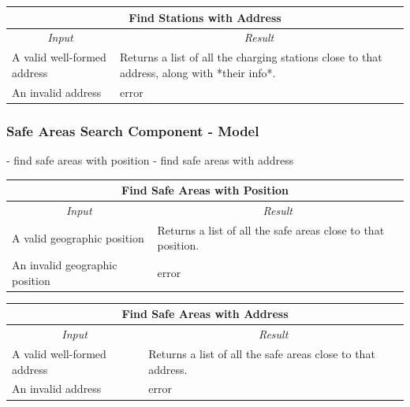 \documentclass[english]{article}
\begin{document}
\begin{center}
	
	\begin{tabular}{ | p{6cm} | p{6cm} | }
		\hline 
		\multicolumn{2}{|c|}{\textbf{Find Stations with Address}} \\
		\hline
		\multicolumn{1}{|c|}{\textit{Input}} & \multicolumn{1}{c|}{\textit{Result}} \\
		\hline
		A valid well-formed address & Returns a list of all the charging stations close to that address, along with *their info*. \\
		\hline
		An invalid address & error \\
		\hline
	\end{tabular}
\end{center}

\subsubsection{Safe Areas Search Component - Model}
- find safe areas with position
- find safe areas with address

\begin{center}

	\begin{tabular}{ | p{6cm} | p{6cm} | }
		\hline 
		\multicolumn{2}{|c|}{\textbf{Find Safe Areas with Position}} \\
		\hline
		\multicolumn{1}{|c|}{\textit{Input}} & \multicolumn{1}{c|}{\textit{Result}} \\
		\hline
		A valid geographic position & Returns a list of all the safe areas close to that position. \\
		\hline
		An invalid geographic position & error \\
		\hline
	\end{tabular}
\end{center}

\begin{center}

	\begin{tabular}{ | p{6cm} | p{6cm} | }
		\hline 
		\multicolumn{2}{|c|}{\textbf{Find Safe Areas with Address}} \\
		\hline
		\multicolumn{1}{|c|}{\textit{Input}} & \multicolumn{1}{c|}{\textit{Result}} \\
		\hline
		A valid well-formed address & Returns a list of all the safe areas close to that address. \\
		\hline
		An invalid address & error \\
		\hline
	\end{tabular}
\end{center}
\end{document}
